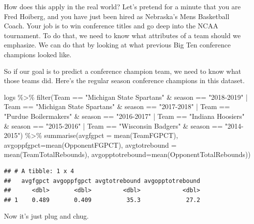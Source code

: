 \documentclass[
]{book}
\newenvironment{Shaded}{\begin{snugshade}}{\end{snugshade}}
\newcommand{\AttributeTok}[1]{\textcolor[rgb]{0.77,0.63,0.00}{#1}}
\newcommand{\FunctionTok}[1]{\textcolor[rgb]{0.00,0.00,0.00}{#1}}
\newcommand{\NormalTok}[1]{#1}
\newcommand{\SpecialCharTok}[1]{\textcolor[rgb]{0.00,0.00,0.00}{#1}}
\newcommand{\StringTok}[1]{\textcolor[rgb]{0.31,0.60,0.02}{#1}}
\begin{document}
How does this apply in the real world? Let's pretend for a minute that you are Fred Hoiberg, and you have just been hired as Nebraska's Mens Basketball Coach. Your job is to win conference titles and go deep into the NCAA tournament. To do that, we need to know what attributes of a team should we emphasize. We can do that by looking at what previous Big Ten conference champions looked like.

So if our goal is to predict a conference champion team, we need to know what those teams did. Here's the regular season conference champions in this dataset.

\begin{Shaded}
\begin{Highlighting}[]
\NormalTok{logs }\SpecialCharTok{\%\textgreater{}\%} \FunctionTok{filter}\NormalTok{(Team }\SpecialCharTok{==} \StringTok{"Michigan State Spartans"} \SpecialCharTok{\&}\NormalTok{ season }\SpecialCharTok{==} \StringTok{"2018{-}2019"} \SpecialCharTok{|}\NormalTok{ Team }\SpecialCharTok{==} \StringTok{"Michigan State Spartans"} \SpecialCharTok{\&}\NormalTok{ season }\SpecialCharTok{==} \StringTok{"2017{-}2018"} \SpecialCharTok{|}\NormalTok{ Team }\SpecialCharTok{==} \StringTok{"Purdue Boilermakers"} \SpecialCharTok{\&}\NormalTok{ season }\SpecialCharTok{==} \StringTok{"2016{-}2017"} \SpecialCharTok{|}\NormalTok{ Team }\SpecialCharTok{==} \StringTok{"Indiana Hoosiers"} \SpecialCharTok{\&}\NormalTok{ season }\SpecialCharTok{==} \StringTok{"2015{-}2016"} \SpecialCharTok{|}\NormalTok{ Team }\SpecialCharTok{==} \StringTok{"Wisconsin Badgers"} \SpecialCharTok{\&}\NormalTok{ season }\SpecialCharTok{==} \StringTok{"2014{-}2015"}\NormalTok{) }\SpecialCharTok{\%\textgreater{}\%} \FunctionTok{summarise}\NormalTok{(}\AttributeTok{avgfgpct =} \FunctionTok{mean}\NormalTok{(TeamFGPCT), }\AttributeTok{avgoppfgpct=}\FunctionTok{mean}\NormalTok{(OpponentFGPCT), }\AttributeTok{avgtotrebound =} \FunctionTok{mean}\NormalTok{(TeamTotalRebounds), }\AttributeTok{avgopptotrebound=}\FunctionTok{mean}\NormalTok{(OpponentTotalRebounds))}
\end{Highlighting}
\end{Shaded}

\begin{verbatim}
## # A tibble: 1 x 4
##   avgfgpct avgoppfgpct avgtotrebound avgopptotrebound
##      <dbl>       <dbl>         <dbl>            <dbl>
## 1    0.489       0.409          35.3             27.2
\end{verbatim}

Now it's just plug and chug.
\end{document}
